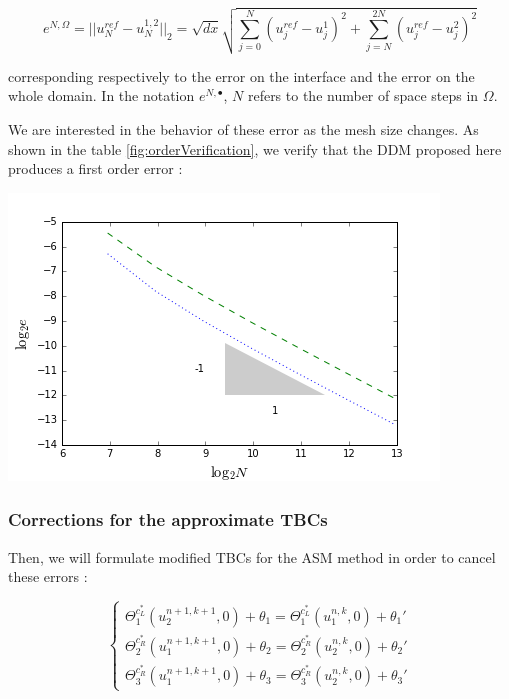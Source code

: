 \begin{equation}
	e^{N,\Omega} = ||u^{ref}_N - u^{1,2}_N||_2 = \sqrt{dx}\sqrt{\sum_{j=0}^N{(u^{ref}_j - u^{1}_j)^2 } + \sum_{j=N}^{2N}{(u^{ref}_j - u^{2}_j)^2 } }
\end{equation}

\noindent corresponding respectively to the error on the interface and the error on the whole domain. In the notation $e^{N,\bullet}$, $N$ refers to the number of space steps in $\Omega$.

\indent We are interested in the behavior of these error as the mesh size changes. As shown in the table \ref{fig:orderVerification}, we verify that the DDM proposed here produces a first order error :

\begin{center}
	\includegraphics[scale=.5]{figures/convergenceVerification.png}
\end{center}

\subsubsection{Corrections for the approximate TBCs}

\indent Then, we will formulate modified TBCs for the ASM method in order to cancel these errors :

\begin{equation}
    \begin{cases}
        \Theta_1^{c_L^*}(u_2^{n+1,k+1},0) + \theta_1 = \Theta_1^{c_L^*}(u_1^{n,k},0) + \theta_1' \\
        \Theta_2^{c_R^*}(u_1^{n+1,k+1},0) + \theta_2 = \Theta_2^{c_R^*}(u_2^{n,k},0) + \theta_2' \\
        \Theta_3^{c_R^*}(u_1^{n+1,k+1},0) + \theta_3 = \Theta_3^{c_R^*}(u_2^{n,k},0) + \theta_3'
    \end{cases}
\end{equation}


